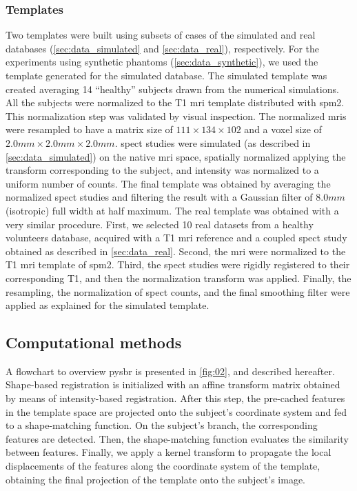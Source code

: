 \documentclass{frontiers}
\begin{document}
\subsubsection{Templates} %
\label{sec:data_templates}

Two templates were built using subsets of cases of the simulated and real
  databases (\autoref{sec:data_simulated} and \autoref{sec:data_real}), respectively.
For the experiments using synthetic phantoms (\autoref{sec:data_synthetic}),
  we used the template generated for the simulated database.
The simulated template was created averaging 14 ``healthy'' subjects drawn from
  the numerical simulations.
All the subjects were normalized to the T1 \gls*{mri} template distributed with
  \gls*{spm}2.
This normalization step was validated by visual inspection.
The normalized \glspl*{mri} were resampled to have a matrix size of
  $111\times134\times102$ and a voxel size of $2.0mm\times2.0mm\times2.0mm$.
\Gls*{spect} studies were simulated (as described in \autoref{sec:data_simulated})
  on the native \gls*{mri} space, spatially normalized applying the transform
  corresponding to the subject, and intensity was normalized to a
  uniform number of counts.
The final template was obtained by averaging the normalized \gls*{spect} studies
  and filtering the result with a Gaussian filter of $8.0mm$ (isotropic)
  full width at half maximum.
The real template was obtained with a very similar procedure. 
First, we selected 10 real datasets from a healthy volunteers database, acquired
  with a T1 \gls*{mri} reference and a coupled \gls*{spect} study obtained as
  described in \autoref{sec:data_real}.
Second, the \gls*{mri} were normalized to the T1 \gls*{mri} template of \gls*{spm}2.
Third, the \gls*{spect} studies were rigidly registered to their corresponding T1, 
  and then the normalization transform was applied.
Finally, the resampling, the normalization of \gls*{spect} counts, and the final
  smoothing filter were applied as explained for the simulated template.

\subsection{Computational methods}
\label{sec:sub_methods}
A flowchart to overview \gls*{pysbr} is presented in \autoref{fig:02},
  and described hereafter.
Shape-based registration is initialized with an affine transform matrix
  obtained by means of intensity-based registration.
After this step, the pre-cached features in the template space are projected
  onto the subject's coordinate system and fed to a shape-matching function.
On the subject's branch, the corresponding features are detected.
Then, the shape-matching function evaluates the similarity between features.
Finally, we apply a kernel transform to propagate the local displacements of
  the features along the coordinate system of the template, obtaining the final
  projection of the template onto the subject's image.
\end{document}
